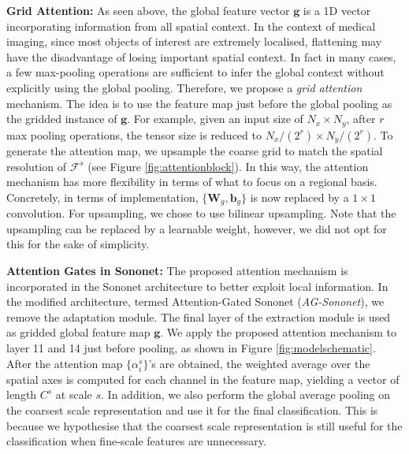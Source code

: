 \documentclass{article}
\providecommand{\mb}[1]{\mathbf{#1}}
\begin{document}
\textbf{Grid Attention:} As seen above, the global feature vector $\mb{g}$ is a 1D vector incorporating information from all spatial context. In the context of medical imaging, since most objects of interest are extremely localised, flattening may have the disadvantage of losing important spatial context. In fact in many cases, a few max-pooling operations are sufficient to infer the global context without explicitly using the global pooling. Therefore, we propose a \emph{grid attention} mechanism. The idea is to use the feature map just before the global pooling as the gridded instance of $\mb{g}$. For example, given an input size of $N_x\times N_y$, after $r$ max pooling operations, the tensor size is reduced to $N_x / (2^r) \times N_y / (2^r)$. To generate the attention map, we upsample the coarse grid to match the spatial resolution of $\mathcal{F}^s$ (see Figure \ref{fig:attentionblock}). In this way, the attention mechanism has more flexibility in terms of what to focus on a regional basis. Concretely, in terms of implementation, $\{\mb{W}_g, \mb{b}_g\}$ is now replaced by a $1 \times 1$ convolution. For upsampling, we chose to use bilinear upsampling. Note that the upsampling can be replaced by a learnable weight, however, we did not opt for this for the sake of simplicity.

\textbf{Attention Gates in Sononet:} The proposed attention mechanism is incorporated in the Sononet architecture to better exploit local information. In the modified architecture, termed Attention-Gated Sononet (\emph{AG-Sononet}), we remove the adaptation module. The final layer of the extraction module is used as gridded global feature map $\mb{g}$. We apply the proposed attention mechanism to layer 11 and 14 just before pooling, as shown in Figure \ref{fig:modelschematic}. After the attention map $\{\alpha_i^s\}$'s are obtained, the weighted average over the spatial axes is computed for each channel in the feature map, yielding a vector of length $C^s$ at scale $s$. In addition, we also perform the global average pooling on the coarsest scale representation and use it for the final classification. This is because we hypothesise that the coarsest scale representation is still useful for the classification when fine-scale features are unnecessary.
\end{document}
